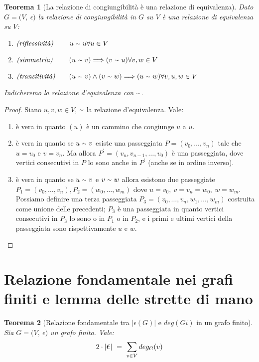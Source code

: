 \documentclass[12pt,twoscolu]{article}
\newcommand{\implica}{\Longrightarrow}
\newcommand{\pr}{\prime}
\newcommand{\Eps}{${\Large$\epsilon$}$}
\newcommand{\grafo}{(V, \: \Eps)}
\newcommand{\til}{\raise.17ex\hbox{$\scriptstyle\mathtt{\sim}$}}
\newtheorem{theorem}{Teorema}
\begin{document}
\begin{theorem}[La relazione di congiungibilità è una relazione di equivalenza]
Dato $G = \grafo$ la relazione di congiungibilità in $G$ su $V$ è una relazione di equivalenza su $V$:
\begin{enumerate}
\item$\textit{(riflessività) }\qquad u\ \til\ u \hfill \forall u \in V$
\item$\textit{(simmetria) }\qquad (u\ \til\ v) \implica (v\ \til\ u) \hfill \forall v, w \in V$
\item$\textit{(transitività)}\qquad (u\ \til\ v) \land (v\ \til\ w) \implica (u\ \til \ w) \hfill \forall v, u, w \in V$
\end{enumerate}
Indicheremo la relazione d'equivalenza con $\til$.
\end{theorem}

\begin{proof}
Siano $u, v, w \in V$, $\til$ la relazione d'equivalenza. Vale:
\begin{enumerate}
\item è vera in quanto $(u)$ è un cammino che congiunge $u$ a $u$.
\item è vera in quanto se $u\ \til\ v$ esiste una passeggiata $P = (v_0,\ldots, v_n)$ tale che $u = v_0$ e $v = v_n$. Ma allora $P^{\pr} = (v_n, v_{n-1},\ldots ,v_0)$ è una passeggiata, dove vertici consecutivi in $P$ lo sono anche in $P^{\pr}$ (anche se in ordine inverso).
\item è vera in quanto se $u\ \til\ v$ e $v\ \til\ w$ allora esistono due passeggiate $P_1 = (v_0,\ldots ,v_n), P_2 = (w_0,\ldots, w_m)$ dove $u = v_0,\ v = v_n = w_0,\ w = w_m$. Possiamo definire una terza passeggiata $P_3 = (v_0,\ldots ,v_n,w_1,\ldots ,w_m)$ costruita come unione delle precedenti; $P_3$ è una passeggiata in quanto vertici consecutivi in $P_3$ lo sono o in $P_1$ o in $P_2$, e i primi e ultimi vertici della passeggiata sono rispettivamente $u$ e $w$.
\end{enumerate}
\end{proof}

\section{Relazione fondamentale nei grafi finiti e lemma delle strette di mano}
\begin{theorem}[Relazione fondamentale tra $|\Eps(G)|$ e $deg(Gi)$ in un grafo finito]
Sia $G = \grafo$ un grafo finito. Vale:
$$ 2 \cdot | \mathlarger{\mathlarger{\epsilon}} | \ = \ \sum_{v\in V} deg_G (v) $$
\end{theorem}
\end{document}
